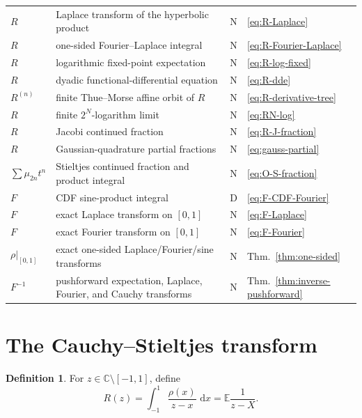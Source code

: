 \documentclass[11pt]{article}
\theoremstyle{definition}
\newtheorem{definition}[theorem]{Definition}
\theoremstyle{remark}
\newcommand{\C}{\mathbb C}
\newcommand{\E}{\mathbb E}
\newcommand{\dd}{\,\mathrm d}
\newcommand{\statusderived}{\textsf{D}}
\newcommand{\statusnew}{\textsf{N}}
\begin{document}
\begin{longtable}{@{}p{}p{}p{}p{}@{}}
\(R\) & Laplace transform of the hyperbolic product & \statusnew & \eqref{eq:R-Laplace} \\
\(R\) & one-sided Fourier--Laplace integral & \statusnew & \eqref{eq:R-Fourier-Laplace} \\
\(R\) & logarithmic fixed-point expectation & \statusnew & \eqref{eq:R-log-fixed} \\
\(R\) & dyadic functional-differential equation & \statusnew & \eqref{eq:R-dde} \\
\(R^{(n)}\) & finite Thue--Morse affine orbit of \(R\) & \statusnew & \eqref{eq:R-derivative-tree} \\
\(R\) & finite \(2^N\)-logarithm limit & \statusnew & \eqref{eq:RN-log} \\
\(R\) & Jacobi continued fraction & \statusnew & \eqref{eq:R-J-fraction} \\
\(R\) & Gaussian-quadrature partial fractions & \statusnew & \eqref{eq:gauss-partial} \\
\(\sum\mu_{2n}t^n\) & Stieltjes continued fraction and product integral & \statusnew & \eqref{eq:O-S-fraction} \\
\(F\) & CDF sine-product integral & \statusderived & \eqref{eq:F-CDF-Fourier} \\
\(F\) & exact Laplace transform on \([0,1]\) & \statusnew & \eqref{eq:F-Laplace} \\
\(F\) & exact Fourier transform on \([0,1]\) & \statusnew & \eqref{eq:F-Fourier} \\
\(\rho|_{[0,1]}\) & exact one-sided Laplace/Fourier/sine transforms & \statusnew & Thm.~\ref{thm:one-sided} \\
\(F^{-1}\) & pushforward expectation, Laplace, Fourier, and Cauchy transforms & \statusnew & Thm.~\ref{thm:inverse-pushforward} \\
\bottomrule
\end{longtable}
\normalsize

\section{The Cauchy--Stieltjes transform}\label{sec:cauchy}

\begin{definition}
For \(z\in\C\setminus[-1,1]\), define
\begin{equation}
 R(z)=\int_{-1}^{1}\frac{\rho(x)}{z-x}\,\dd x=\E\frac1{z-X}. \label{eq:R-def}
\end{equation}
\end{definition}
\end{document}
